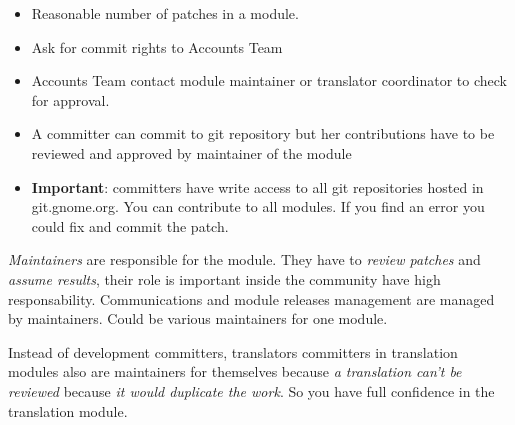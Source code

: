 \begin{itemize}
	\item Reasonable number of patches in a module.
	\item Ask for commit rights to Accounts Team
	\item Accounts Team contact module maintainer or translator coordinator to check for approval.
	\item A committer can commit to git repository but her contributions have to be reviewed and approved by maintainer of the module
	\item \textbf{Important}: committers have write access to all git repositories hosted in git.gnome.org. You can contribute to all modules. If you find an error you could fix and commit the patch.
\end{itemize}

\par \textit{Maintainers} are responsible for the module. They have to \textit{review patches} and \textit{assume results}, their role is important inside the community have high responsability. Communications and module releases management are managed by maintainers. Could be various maintainers for one module.

\par Instead of development committers, translators committers in translation modules also are maintainers for themselves because \textit{a translation can't be reviewed} because \textit{it would duplicate the work}. So you have full confidence in the translation module.

